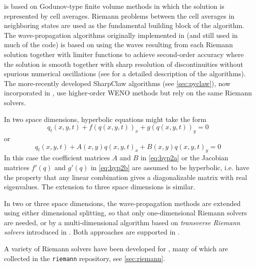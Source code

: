 \clawpack is based on Godunov-type finite volume methods in which
the solution is represented by cell averages.  Riemann problems
between the cell averages in neighboring states are used as the
fundamental building block of the algorithm.
The wave-propagation algorithms originally
implemented in \clawpack (and still used in much of the code) is based on
using the waves resulting from each Riemann solution together with limiter
functions to achieve second-order accuracy where the solution is smooth
together with sharp resolution of discontinuities without spurious numerical
oscillations (see \cite{rjl:fvmhp} for a detailed description of the
algorithms).   The more-recently developed SharpClaw algorithms (see
\cref{sec:pyclaw}), now incorporated in \pyclaw, use higher-order WENO methods
but rely on the same Riemann solvers.

In two space dimensions, hyperbolic equations might take the form
\begin{equation}\label{eq:hyp2a}
q_t(x,y,t) + f(q(x,y,t))_x + g(q(x,y,t))_y = 0
\end{equation}
or
\begin{equation}\label{eq:hyp2b}
q_t(x,y,t) + A(x,y)q(x,y,t)_x + B(x,y)q(x,y,t)_y = 0
\end{equation} 
In this case the
coefficient matrices $A$ and $B$ in \cref{eq:hyp2a} or the Jacobian matrices
$f'(q)$ and $g'(q)$ in \cref{eq:hyp2b} are assumed to be hyperbolic, i.e. have
the property that any
linear combination gives a diagonalizable matrix with real eigenvalues.
The extension to three space dimensions is similar.

In two or three space dimensions, the wave-propagation methods
are extended using either dimensional splitting, so that only
one-dimensional Riemann solvers are needed, or by a multi-dimensional
algorithm based on {\em transverse Riemann solvers} introduced in 
\cite{rjl:wpalg}.  Both approaches are supported in \clawpack.

A variety of Riemann solvers have been developed for \clawpack, many of which
are collected in the \texttt{riemann} repository, see \cref{sec:riemann}.

